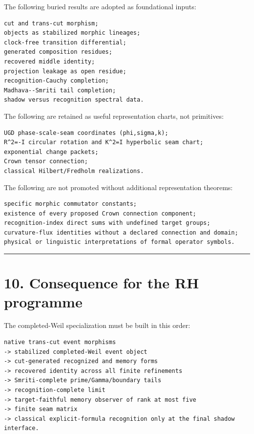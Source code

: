 The following buried results are adopted as foundational inputs:

\begin{verbatim}
cut and trans-cut morphism;
objects as stabilized morphic lineages;
clock-free transition differential;
generated composition residues;
recovered middle identity;
projection leakage as open residue;
recognition-Cauchy completion;
Madhava--Smriti tail completion;
shadow versus recognition spectral data.
\end{verbatim}

The following are retained as useful representation charts, not primitives:

\begin{verbatim}
UGD phase-scale-seam coordinates (phi,sigma,k);
R^2=-I circular rotation and K^2=I hyperbolic seam chart;
exponential change packets;
Crown tensor connection;
classical Hilbert/Fredholm realizations.
\end{verbatim}

The following are not promoted without additional representation theorems:

\begin{verbatim}
specific morphic commutator constants;
existence of every proposed Crown connection component;
recognition-index direct sums with undefined target groups;
curvature-flux identities without a declared connection and domain;
physical or linguistic interpretations of formal operator symbols.
\end{verbatim}

\begin{center}\rule{0.5\linewidth}{0.5pt}\end{center}

\hypertarget{consequence-for-the-rh-programme}{%
\section{10. Consequence for the RH programme}\label{consequence-for-the-rh-programme}}

The completed-Weil specialization must be built in this order:

\begin{verbatim}
native trans-cut event morphisms
-> stabilized completed-Weil event object
-> cut-generated recognized and memory forms
-> recovered identity across all finite refinements
-> Smriti-complete prime/Gamma/boundary tails
-> recognition-complete limit
-> target-faithful memory observer of rank at most five
-> finite seam matrix
-> classical explicit-formula recognition only at the final shadow interface.
\end{verbatim}

